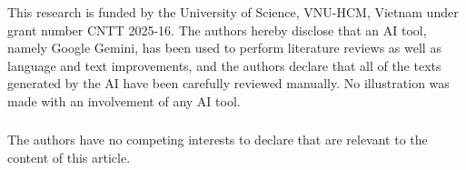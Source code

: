 \documentclass[runningheads]{llncs}
\begin{document}
\begin{credits}
  \subsubsection{\ackname} This research is funded by the University of Science, VNU-HCM, Vietnam under grant number CNTT 2025-16. The authors hereby disclose that an AI tool, namely Google Gemini, has been used to perform literature reviews as well as language and text improvements, and the authors declare that all of the texts generated by the AI have been carefully reviewed manually. No illustration was made with an involvement of any AI tool.

  \subsubsection{\discintname}
  The authors have no competing interests to declare that are
  relevant to the content of this article.
\end{credits}



\end{document}
